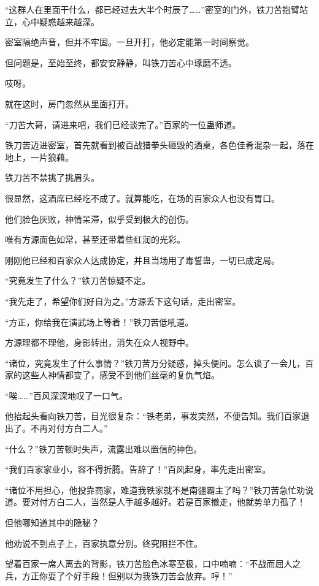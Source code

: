 
\begin{this_body}

“这群人在里面干什么，都已经过去大半个时辰了……”密室的门外，铁刀苦抱臂站立，心中疑惑越来越深。

密室隔绝声音，但并不牢固。一旦开打，他必定能第一时间察觉。

但问题是，至始至终，都安安静静，叫铁刀苦心中琢磨不透。

吱呀。

就在这时，房门忽然从里面打开。

“刀苦大哥，请进来吧，我们已经谈完了。”百家的一位蛊师道。

铁刀苦迈进密室，首先就看到被百战猎拳头砸毁的酒桌，各色佳肴混杂一起，落在地上，一片狼藉。

铁刀苦不禁挑了挑眉头。

很显然，这酒席已经吃不成了。就算能吃，在场的百家众人也没有胃口。

他们脸色灰败，神情呆滞，似乎受到极大的创伤。

唯有方源面色如常，甚至还带着些红润的光彩。

刚刚他已经和百家众人达成协定，并且当场用了毒誓蛊，一切已成定局。

“究竟发生了什么？”铁刀苦惊疑不定。

“我先走了，希望你们好自为之。”方源丢下这句话，走出密室。

“方正，你给我在演武场上等着！”铁刀苦低吼道。

方源理都不理他，身影转出，消失在众人视野中。

“诸位，究竟发生了什么事情？”铁刀苦万分疑惑，掉头便问。怎么谈了一会儿，百家的这些人神情都变了，感受不到他们丝毫的复仇气焰。

“唉……”百风深深地叹了一口气。

他抬起头看向铁刀苦，目光很复杂：“铁老弟，事发突然，不便告知。我们百家退出了。不再对付方白二人。”

“什么？”铁刀苦顿时失声，流露出难以置信的神色。

“我们百家家业小，容不得折腾。告辞了！”百风起身，率先走出密室。

“诸位不用担心，他投靠商家，难道我铁家就不是南疆霸主了吗？”铁刀苦急忙劝说道。要对付方白二人，当然是人手越多越好。若是百家撤走，他就势单力孤了！

但他哪知道其中的隐秘？

他劝说不到点子上，百家执意分别。终究阻拦不住。

望着百家一席人离去的背影，铁刀苦脸色冰寒至极，口中喃喃：“不战而屈人之兵，方正你耍了个好手段！但别以为我铁刀苦会放弃。哼！”


\end{this_body}
